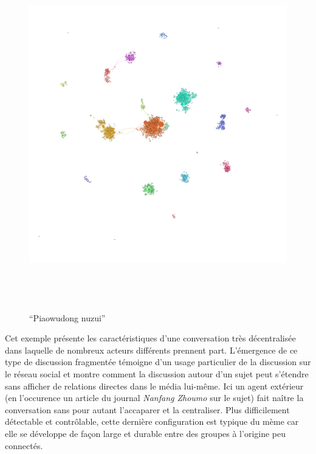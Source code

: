 \begin{figure}[th]
    \centering
    \includegraphics[width=6.0114in,height=6.0114in]{figures/chap3/chapitre3-img19.png}
    \caption{ {\textquotedblleft}Piaowudong nuzui{\textquotedblright}}
\end{figure}

Cet exemple présente les caractéristiques d{\textquoteright}une conversation très décentralisée dans laquelle de nombreux acteurs différents prennent part. L{\textquoteright}émergence de ce type de discussion fragmentée témoigne d{\textquoteright}un usage particulier de la discussion sur le réseau social et montre comment la discussion autour d{\textquoteright}un sujet peut s{\textquoteright}étendre sans afficher de relations directes dans le média lui-m\^eme. Ici un agent extérieur (en l{\textquoteright}occurence un article du journal \textit{Nanfang Zhoumo }sur le sujet) fait na\^itre la conversation sans pour autant l{\textquoteright}accaparer et la centraliser. Plus difficilement détectable et contr\^olable, cette dernière configuration est typique du mème car elle se développe de fa\c{c}on large et durable entre des groupes à l{\textquoteright}origine peu connectés.

